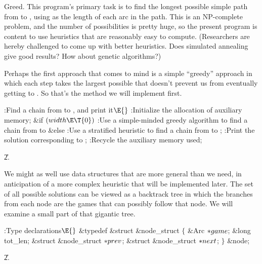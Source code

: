 Greed. This program's primary task is to find the longest possible
simple path from  to , using  as the
length of each
arc in the path. This is an NP-complete problem, and the number of
possibilities is pretty huge, so the present program is content to
use heuristics that are reasonably easy to compute. (Researchers are hereby
challenged to come up with better heuristics. Does simulated annealing
give good results? How about genetic algorithms?)

Perhaps the first approach that comes to mind is a simple ``greedy'' approach
in which each step takes the largest possible  that doesn't prevent
us from eventually getting to . So that's the method we will
implement first.

\fi

\B{}:Find a chain from  to , and print it\X${}%
\E{}$\6
:Initialize the allocation of auxiliary memory\X;\6
\&{if} ${}(\\{width}\E\T{0}){}$\1\5
:Use a simple-minded greedy algorithm to find a chain from 
to \X\2\6
\&{else}\1\5
:Use a stratified heuristic to find a chain from  to \X;\2\6
:Print the solution corresponding to \X;\6
:Recycle the auxiliary memory used\X;\par
\U2.\fi

We might as well use data structures that are more general than we need,
in anticipation of a more complex heuristic that will be implemented later.
The set of all possible solutions can be viewed as a backtrack tree
in which the branches from each node are the games that can possibly
follow that node. We will examine a small part of that gigantic tree.

\Y\B\4:Type declarations\X${}\E{}$\6
\&{typedef} \&{struct} \&{node\_struct} ${}\{{}$\1\6
\&{Arc} ${}{*}\\{game}{}$;\6
\&{long} \\{tot\_len};\6
\&{struct} \&{node\_struct} ${}{*}\\{prev}{}$;\6
\&{struct} \&{node\_struct} ${}{*}\\{next}{}$;\2\6
${}\}{}$ \&{node};\par
\U2.\fi

